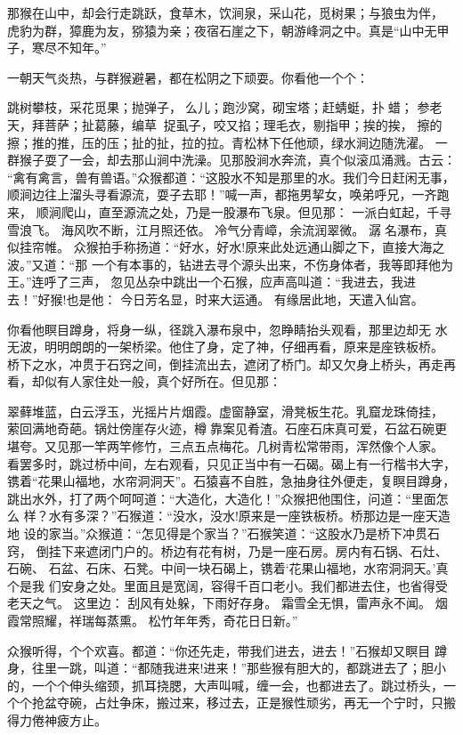 那猴在山中，却会行走跳跃，食草木，饮涧泉，采山花，觅树果；与狼虫为伴，
虎豹为群，獐鹿为友，猕猿为亲；夜宿石崖之下，朝游峰洞之中。真是“山中无甲
子，寒尽不知年。”

一朝天气炎热，与群猴避暑，都在松阴之下顽耍。你看他一个个：

跳树攀枝，采花觅果；抛弹子，么儿；跑沙窝，砌宝塔；赶蜻蜓，扑蜡；
参老天，拜菩萨；扯葛藤，编草；捉虱子，咬又掐；理毛衣，剔指甲；挨的挨，
擦的擦；推的推，压的压；扯的扯，拉的拉。青松林下任他顽，绿水涧边随洗濯。
一群猴子耍了一会，却去那山涧中洗澡。见那股涧水奔流，真个似滚瓜涌溅。古云：
“禽有禽言，兽有兽语。”众猴都道：“这股水不知是那里的水。我们今日赶闲无事，
顺涧边往上溜头寻看源流，耍子去耶！”喊一声，都拖男挈女，唤弟呼兄，一齐跑来，
顺涧爬山，直至源流之处，乃是一股瀑布飞泉。但见那：
一派白虹起，千寻雪浪飞。
海风吹不断，江月照还依。
冷气分青嶂，余流润翠微。
潺名瀑布，真似挂帘帷。
众猴拍手称扬道：“好水，好水!原来此处远通山脚之下，直接大海之波。”又道：“那
一个有本事的，钻进去寻个源头出来，不伤身体者，我等即拜他为王。”连呼了三声，
忽见丛杂中跳出一个石猴，应声高叫道：“我进去，我进去！”好猴!也是他：
今日芳名显，时来大运通。
有缘居此地，天遣入仙宫。

你看他瞑目蹲身，将身一纵，径跳入瀑布泉中，忽睁睛抬头观看，那里边却无
水无波，明明朗朗的一架桥梁。他住了身，定了神，仔细再看，原来是座铁板桥。
桥下之水，冲贯于石窍之间，倒挂流出去，遮闭了桥门。却又欠身上桥头，再走再
看，却似有人家住处一般，真个好所在。但见那：

翠藓堆蓝，白云浮玉，光摇片片烟霞。虚窗静室，滑凳板生花。乳窟龙珠倚挂，
萦回满地奇葩。锅灶傍崖存火迹，樽靠案见肴渣。石座石床真可爱，石盆石碗更
堪夸。又见那一竿两竿修竹，三点五点梅花。几树青松常带雨，浑然像个人家。
看罢多时，跳过桥中间，左右观看，只见正当中有一石碣。碣上有一行楷书大字，
镌着“花果山福地，水帘洞洞天”。石猿喜不自胜，急抽身往外便走，复瞑目蹲身，
跳出水外，打了两个呵呵道：“大造化，大造化！”众猴把他围住，问道：“里面怎么
样？水有多深？”石猴道：“没水，没水!原来是一座铁板桥。桥那边是一座天造地
设的家当。”众猴道：“怎见得是个家当？”石猴笑道：“这股水乃是桥下冲贯石窍，
倒挂下来遮闭门户的。桥边有花有树，乃是一座石房。房内有石锅、石灶、石碗、
石盆、石床、石凳。中间一块石碣上，镌着‘花果山福地，水帘洞洞天。’真个是我
们安身之处。里面且是宽阔，容得千百口老小。我们都进去住，也省得受老天之气。
这里边：
刮风有处躲，下雨好存身。
霜雪全无惧，雷声永不闻。
烟霞常照耀，祥瑞每蒸熏。
松竹年年秀，奇花日日新。”

众猴听得，个个欢喜。都道：“你还先走，带我们进去，进去！”石猴却又瞑目
蹲身，往里一跳，叫道：“都随我进来!进来！”那些猴有胆大的，都跳进去了；胆小
的，一个个伸头缩颈，抓耳挠腮，大声叫喊，缠一会，也都进去了。跳过桥头，一
个个抢盆夺碗，占灶争床，搬过来，移过去，正是猴性顽劣，再无一个宁时，只搬
得力倦神疲方止。

